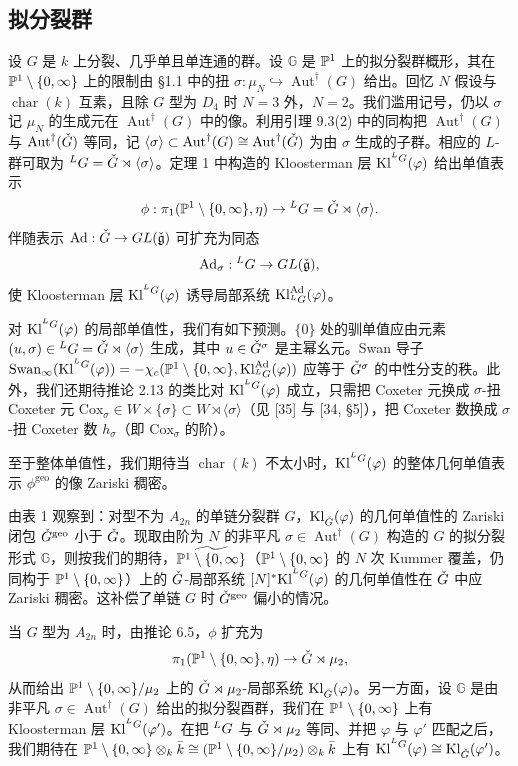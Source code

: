 \subsection{拟分裂群}

设 $G$ 是 $k$ 上分裂、几乎单且单连通的群。设 $\mathbb G$ 是 $\mathbb{P}^1$ 上的拟分裂群概形，其在 $\mathbb{P}^1\setminus\{0,\infty\}$ 上的限制由 §1.1 中的扭 $\sigma:\mu_N\hookrightarrow\operatorname{Aut}^\dagger(G)$ 给出。回忆 $N$ 假设与 $\operatorname{char}(k)$ 互素，且除 $G$ 型为 $D_4$ 时 $N=3$ 外，$N=2$。我们滥用记号，仍以 $\sigma$ 记 $\mu_N$ 的生成元在 $\operatorname{Aut}^\dagger(G)$ 中的像。利用引理 9.3(2) 中的同构把 $\operatorname{Aut}^\dagger(G)$ 与 $\operatorname{Aut}^\dagger(\check G)$ 等同，记 $\langle\sigma\rangle\subset\operatorname{Aut}^\dagger(G)\cong\operatorname{Aut}^\dagger(\check G)$ 为由 $\sigma$ 生成的子群。相应的 $L$-群可取为 ${}^L G=\check G\rtimes\langle\sigma\rangle$。定理 1 中构造的 Kloosterman 层 $\mathrm{Kl}^{{}^L G}(\varphi)$ 给出单值表示
\[
\phi:\pi_1(\mathbb{P}^1\setminus\{0,\infty\},\eta)\to{}^L G=\check G\rtimes\langle\sigma\rangle.
\]
伴随表示 $\mathrm{Ad}:\check G\to GL(\check{\mathfrak g})$ 可扩充为同态
\[
\mathrm{Ad}_\sigma:{}^L G\to GL(\check{\mathfrak g}),
\]
使 Kloosterman 层 $\mathrm{Kl}^{{}^L G}(\varphi)$ 诱导局部系统 $\mathrm{Kl}^{\mathrm{Ad}}_{{}^L G}(\varphi)$。

对 $\mathrm{Kl}^{{}^L G}(\varphi)$ 的局部单值性，我们有如下预测。$\{0\}$ 处的驯单值应由元素 $(u,\sigma)\in{}^L G=\check G\rtimes\langle\sigma\rangle$ 生成，其中 $u\in\check G^\sigma$ 是主幂幺元。Swan 导子 $\mathrm{Swan}_\infty(\mathrm{Kl}^{{}^L G}(\varphi))=-\chi_c(\mathbb{P}^1\setminus\{0,\infty\},\mathrm{Kl}^{\mathrm{Ad}}_{{}^L G}(\varphi))$ 应等于 $\check G^\sigma$ 的中性分支的秩。此外，我们还期待推论 2.13 的类比对 $\mathrm{Kl}^{{}^L G}(\varphi)$ 成立，只需把 Coxeter 元换成 $\sigma$-扭 Coxeter 元 $\mathrm{Cox}_\sigma\in W\times\{\sigma\}\subset W\rtimes\langle\sigma\rangle$（见 [35] 与 [34, §5]），把 Coxeter 数换成 $\sigma$-扭 Coxeter 数 $h_\sigma$（即 $\mathrm{Cox}_\sigma$ 的阶）。

至于整体单值性，我们期待当 $\operatorname{char}(k)$ 不太小时，$\mathrm{Kl}^{{}^L G}(\varphi)$ 的整体几何单值表示 $\phi^{\mathrm{geo}}$ 的像 Zariski 稠密。

由表 1 观察到：对型不为 $A_{2n}$ 的单链分裂群 $G$，$\mathrm{Kl}_{\check G}(\varphi)$ 的几何单值性的 Zariski 闭包 $\check G^{\mathrm{geo}}$ 小于 $\check G$。现取由阶为 $N$ 的非平凡 $\sigma\in\operatorname{Aut}^\dagger(G)$ 构造的 $G$ 的拟分裂形式 $\mathbb G$，则按我们的期待，$\widetilde{\mathbb{P}^1\setminus\{0,\infty\}}$（$\mathbb{P}^1\setminus\{0,\infty\}$ 的 $N$ 次 Kummer 覆盖，仍同构于 $\mathbb{P}^1\setminus\{0,\infty\}$）上的 $\check G$-局部系统 $[N]^*\mathrm{Kl}^{{}^L G}(\varphi)$ 的几何单值性在 $\check G$ 中应 Zariski 稠密。这补偿了单链 $G$ 时 $\check G^{\mathrm{geo}}$ 偏小的情况。

当 $G$ 型为 $A_{2n}$ 时，由推论 6.5，$\phi$ 扩充为
\[
\pi_1(\mathbb{P}^1\setminus\{0,\infty\},\eta)\to\check G\rtimes\mu_2,
\]
从而给出 $\mathbb{P}^1\setminus\{0,\infty\}/\mu_2$ 上的 $\check G\rtimes\mu_2$-局部系统 $\mathrm{Kl}_{\check G}(\varphi)$。另一方面，设 $\mathbb G$ 是由非平凡 $\sigma\in\operatorname{Aut}^\dagger(G)$ 给出的拟分裂酉群，我们在 $\mathbb{P}^1\setminus\{0,\infty\}$ 上有 Kloosterman 层 $\mathrm{Kl}^{{}^L G}(\varphi')$。在把 ${}^L G$ 与 $\check G\rtimes\mu_2$ 等同、并把 $\varphi$ 与 $\varphi'$ 匹配之后，我们期待在 $\mathbb{P}^1\setminus\{0,\infty\}\otimes_k\bar k\cong(\mathbb{P}^1\setminus\{0,\infty\}/\mu_2)\otimes_k\bar k$ 上有 $\mathrm{Kl}^{{}^L G}(\varphi)\cong\mathrm{Kl}_{\check G}(\varphi')$。
